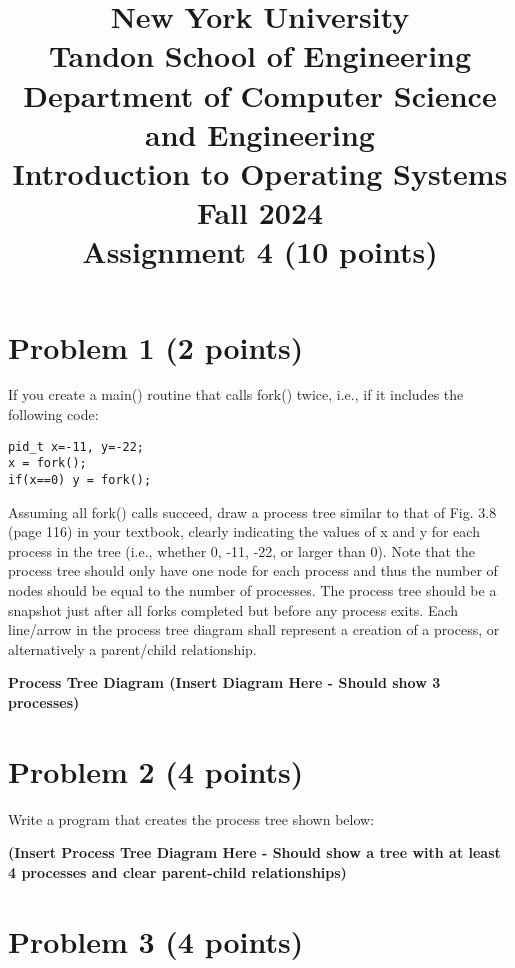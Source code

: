 \documentclass{article}
\begin{document}
\title{New York University \\ Tandon School of Engineering \\ Department of Computer Science and Engineering \\ Introduction to Operating Systems \\ Fall 2024 \\ Assignment 4 (10 points)}
\date{}
\maketitle

\section*{Problem 1 (2 points)}

If you create a main() routine that calls fork() twice, i.e., if it includes the following code:

\begin{verbatim}
pid_t x=-11, y=-22;
x = fork();
if(x==0) y = fork();
\end{verbatim}

Assuming all fork() calls succeed, draw a process tree similar to that of Fig. 3.8 (page 116) in your textbook, clearly indicating the values of x and y for each process in the tree (i.e., whether 0, -11, -22, or larger than 0). Note that the process tree should only have one node for each process and thus the number of nodes should be equal to the number of processes. The process tree should be a snapshot just after all forks completed but before any process exits. Each line/arrow in the process tree diagram shall represent a creation of a process, or alternatively a parent/child relationship.

\textbf{Process Tree Diagram (Insert Diagram Here -  Should show 3 processes)}


\section*{Problem 2 (4 points)}

Write a program that creates the process tree shown below:

\textbf{(Insert Process Tree Diagram Here - Should show a tree with at least 4 processes and clear parent-child relationships)}


\section*{Problem 3 (4 points)}
\end{document}
